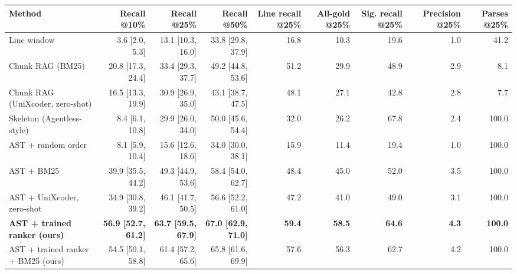 \begin{tabular}{lrrrrrrrr}
\toprule
Method & Recall @10\% & Recall @25\% & Recall @50\% & Line recall @25\% & All-gold @25\% & Sig. recall @25\% & Precision @25\% & Parses @25\% \\
\midrule
Line window & 3.6 [2.0, 5.3] & 13.1 [10.3, 16.0] & 33.8 [29.8, 37.9] & 16.8 & 10.3 & 19.6 & 1.0 & 41.2 \\
Chunk RAG (BM25) & 20.8 [17.3, 24.4] & 33.4 [29.3, 37.7] & 49.2 [44.8, 53.6] & 51.2 & 29.9 & 48.9 & 2.9 & 8.1 \\
Chunk RAG (UniXcoder, zero-shot) & 16.5 [13.3, 19.9] & 30.9 [26.9, 35.0] & 43.1 [38.7, 47.5] & 48.1 & 27.1 & 42.8 & 2.8 & 7.7 \\
Skeleton (Agentless-style) & 8.4 [6.1, 10.8] & 29.9 [26.0, 34.0] & 50.0 [45.6, 54.4] & 32.0 & 26.2 & 67.8 & 2.4 & 100.0 \\
AST + random order & 8.1 [5.9, 10.4] & 15.6 [12.6, 18.6] & 34.0 [30.0, 38.1] & 15.9 & 11.4 & 19.4 & 1.0 & 100.0 \\
AST + BM25 & 39.9 [35.5, 44.2] & 49.3 [44.9, 53.6] & 58.4 [54.0, 62.7] & 48.4 & 45.0 & 52.0 & 3.5 & 100.0 \\
AST + UniXcoder, zero-shot & 34.9 [30.8, 39.2] & 46.1 [41.7, 50.5] & 56.6 [52.2, 61.0] & 47.2 & 41.0 & 49.0 & 3.1 & 100.0 \\
\textbf{AST + trained ranker (ours)} & \textbf{56.9 [52.7, 61.2]} & \textbf{63.7 [59.5, 67.9]} & \textbf{67.0 [62.9, 71.0]} & \textbf{59.4} & \textbf{58.5} & \textbf{64.6} & \textbf{4.3} & \textbf{100.0} \\
AST + trained ranker + BM25 (ours) & 54.5 [50.1, 58.8] & 61.4 [57.2, 65.6] & 65.8 [61.6, 69.9] & 57.6 & 56.3 & 62.7 & 4.2 & 100.0 \\
\bottomrule
\end{tabular}
